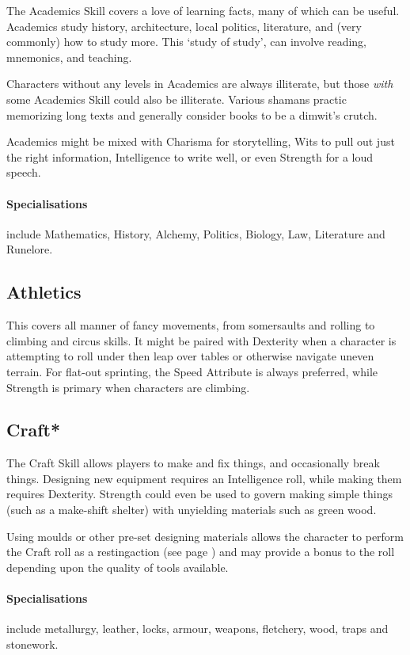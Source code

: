 \begin{multicols}{2}
The Academics Skill covers a love of learning facts, many of which can be useful.
Academics study history, architecture, local politics, literature, and (very commonly) how to study more.
This `study of study', can involve reading, mnemonics, and teaching.

Characters without any levels in Academics are always illiterate, but those \emph{with} some Academics Skill could also be illiterate.
Various shamans practic memorizing long texts and generally consider books to be a dimwit's crutch.

Academics might be mixed with Charisma for storytelling, Wits to pull out just the right information, Intelligence to write well, or even Strength for a loud speech.

\paragraph{Specialisations} include Mathematics, History, Alchemy, Politics, Biology, Law, Literature and Runelore.

\subsection{Athletics}

This covers all manner of fancy movements, from somersaults and rolling to climbing and circus skills. It might be paired with Dexterity when a character is attempting to roll under then leap over tables or otherwise navigate uneven terrain. For flat-out sprinting, the Speed Attribute is always preferred, while Strength is primary when characters are climbing.

\subsection{Craft*}

The Craft Skill allows players to make and fix things, and occasionally break things.
Designing new equipment requires an Intelligence roll, while making them requires Dexterity.
Strength could even be used to govern making simple things (such as a make-shift shelter) with unyielding materials such as green wood.

Using moulds or other pre-set designing materials allows the character to perform the Craft roll as a \gls{restingaction} (see page \pageref{restingactions}) and may provide a bonus to the roll depending upon the quality of tools available.

\paragraph{Specialisations} include metallurgy, leather, locks, armour, weapons, fletchery, wood, traps and stonework.


\end{multicols}
